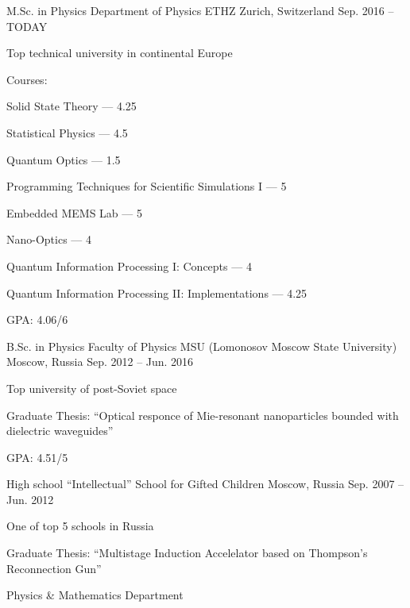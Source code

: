 \begin{cventries}
\cventry
	{M.Sc. in Physics}
	{Department of Physics ETHZ}
	{Zurich, Switzerland}
	{Sep. 2016 -- TODAY}
	{
		\begin{cvitems}
			\item {Top technical university in continental Europe}
			\item {Courses:}
			\item {Solid State Theory --- 4.25}
			\item {Statistical Physics --- 4.5}
			\item {Quantum Optics --- 1.5}
			\item {Programming Techniques for Scientific Simulations I --- 5}
			\item {Embedded MEMS Lab --- 5}
			\item {Nano-Optics --- 4}
			\item {Quantum Information Processing I: Concepts --- 4}
			\item {Quantum Information Processing II: Implementations --- 4.25}
			\item {GPA: 4.06/6}
		\end{cvitems}
	}
	
\cventry
	{B.Sc. in Physics}
	{Faculty of Physics MSU (Lomonosov Moscow State University)}
	{Moscow, Russia}
	{Sep. 2012 -- Jun. 2016}
	{
		\begin{cvitems}
			\item {Top university of post-Soviet space}
			\item {Graduate Thesis: ``Optical responce of Mie-resonant nanoparticles bounded with dielectric waveguides''}
			\item {GPA: 4.51/5}
		\end{cvitems}
	}
	
\cventry
	{High school}
	{\enquote{Intellectual} School for Gifted Children}
	{Moscow, Russia}
	{Sep. 2007 -- Jun. 2012}
	{
		\begin{cvitems}
			\item {One of top 5 schools in Russia}
			\item {Graduate Thesis: ``Multistage Induction Accelelator based on Thompson's Reconnection Gun''}
			\item {Physics \& Mathematics Department}
		\end{cvitems}
	}
\end{cventries}
